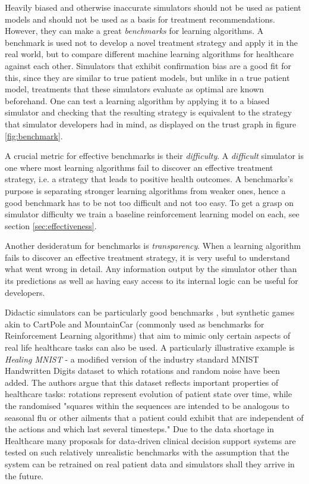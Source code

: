 
Heavily biased and otherwise inaccurate simulators should not be used as patient models and should not be used as a basis for treatment recommendations. 
However, they can make a great \emph{benchmarks} for learning algorithms.
A benchmark is used not to develop a novel treatment strategy and apply it in the real world, but to compare different machine learning algorithms for healthcare against each other. 
Simulators that exhibit confirmation bias are a good fit for this, since they are similar to true patient models, but unlike in a true patient model, treatments that these simulators evaluate as optimal are known beforehand. 
One can test a learning algorithm by applying it to a biased simulator and checking that the resulting strategy is equivalent to the strategy that simulator developers had in mind, as displayed on the trust graph in figure \ref{fig:benchmark}.

A crucial metric for effective benchmarks is their \emph{difficulty}. 
A \emph{difficult} simulator is one where most learning algorithms fail to discover an effective treatment strategy, i.e. a strategy that leads to positive health outcomes.
A benchmarks's purpose is separating stronger learning algorithms from weaker ones, hence a good benchmark has to be not too difficult and not too easy.
To get a grasp on simulator difficulty we train a baseline reinforcement learning model on each, see section \ref{sec:effectiveness}.

Another desideratum for benchmarks is \emph{transparency}.
When a learning algorithm fails to discover an effective treatment strategy, it is very useful to understand what went wrong in detail.
Any information output by the simulator other than its predictions as well as having easy access to its internal logic can be useful for developers.

Didactic simulators can be particularly good benchmarks \cite{anthropodidactic}, but synthetic games akin to CartPole \cite{cartpole} and MountainCar \cite{mountain_car} (commonly used as benchmarks for Reinforcement Learning algorithms) that aim to mimic only certain aspects of real life healthcare tasks can also be used.
A particularly illustrative example is \emph{Healing MNIST} \cite{healing-mnist} - a modified version of the industry standard MNIST Handwritten Digits \cite{mnist} dataset to which rotations and random noise have been added.
The authors argue that this dataset reflects important properties of healthcare tasks: rotations represent evolution of patient state over time, while the randomised "squares within the sequences are intended to be analogous to seasonal flu or other ailments that a patient could exhibit that are independent of the actions and which last several timesteps."
Due to the data shortage in Healthcare many proposals for data-driven clinical decision support systems are tested on such relatively unrealistic benchmarks with the assumption that the system can be retrained on real patient data and simulators shall they arrive in the future.

